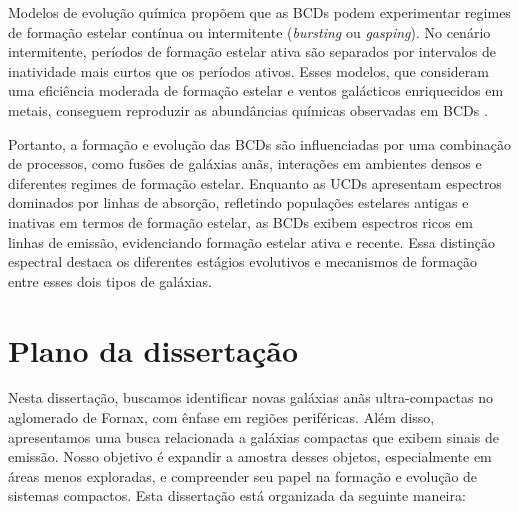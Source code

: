 
Modelos de evolução química propõem que as BCDs podem experimentar regimes de formação estelar contínua ou intermitente (\textit{bursting} ou \textit{gasping}). No cenário intermitente, períodos de formação estelar ativa são separados por intervalos de inatividade mais curtos que os períodos ativos. Esses modelos, que consideram uma eficiência moderada de formação estelar e ventos galácticos enriquecidos em metais, conseguem reproduzir as abundâncias químicas observadas em BCDs \citep{Yin_2011}.

Portanto, a formação e evolução das BCDs são influenciadas por uma combinação de processos, como fusões de galáxias anãs, interações em ambientes densos e diferentes regimes de formação estelar. Enquanto as UCDs apresentam espectros dominados por linhas de absorção, refletindo populações estelares antigas e inativas em termos de formação estelar, as BCDs exibem espectros ricos em linhas de emissão, evidenciando formação estelar ativa e recente. Essa distinção espectral destaca os diferentes estágios evolutivos e mecanismos de formação entre esses dois tipos de galáxias.

\section{Plano da dissertação}\label{sec:plano_dissertacao}\label{sec:plano_dissertacao}
Nesta dissertação, buscamos identificar novas galáxias anãs ultra-compactas no aglomerado de Fornax, com ênfase em regiões periféricas. Além disso, apresentamos uma busca relacionada a galáxias compactas que exibem sinais de emissão. Nosso objetivo é expandir a amostra desses objetos, especialmente em áreas menos exploradas, e compreender seu papel na formação e evolução de sistemas compactos. Esta dissertação está organizada da seguinte maneira:

